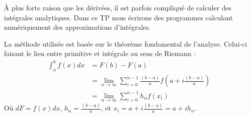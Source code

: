 
À plus forte raison que les dérivées, il est parfois compliqué de calculer
des intégrales analytiques. Dans ce TP nous écrirons des programmes
calculant numériquement des approximations d'intégrales.

La méthode utilisée est basée sur le théorème fondamental de l'analyse.
Celui-ci faisant le lien entre primitive et intégrale au sens de Riemann :
\begin{equation}
\begin{split}
\int_a^b f(x)dx &= F(b)-F(a) \\
                &= \lim_{n\rightarrow\infty} \sum_{i=0}^{n-1}\frac{(b-a)}{n} f(a+i\frac{(b-a)}{n})\\
                &= \lim_{n\rightarrow\infty} \sum_{i=0}^{n-1} h_n f(x_i)
\end{split}
\end{equation}
Où $dF = f(x)dx$, $h_n=\frac{(b-a)}{n}$, et $x_i=a+ i\frac{(b-a)}{n} = a+ih_n$.

\begin{center}
\end{center}


